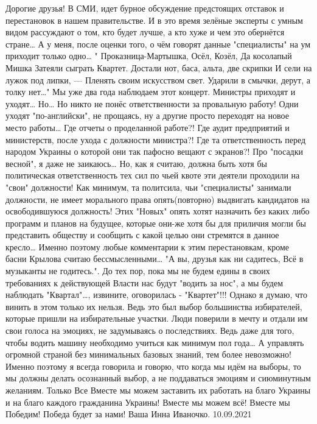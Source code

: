 \obeycr
Дорогие друзья! 
В СМИ, идет бурное обсуждение предстоящих отставок и перестановок в нашем правительстве. 
И в это время зелёные эксперты  с умным видом рассуждают о том, кто будет лучше, а кто хуже и чем это обернётся стране… 
А у меня, после оценки того, о чём говорят данные "специалисты" на ум приходит только одно… 
" Проказница-Мартышка,
Осёл,
Козёл,
Да косолапый Мишка
Затеяли сыграть Квартет.
Достали нот, баса, альта, две скрипки
И сели на лужок под липки, —
Пленять своим искусством свет.
Ударили в смычки, дерут, а толку нет…" 
Мы уже два года наблюдаем этот концерт. 
Министры приходят и уходят… 
Но… 
Но никто не понёс ответственности за провальную работу! 
Одни уходят "по-английски", не прощаясь, ну а другие просто переходят на новое место работы… 
Где отчеты о проделанной работе?!
Где аудит предприятий и министерств, после ухода с должности министра?! 
Где та ответственность  перед народом Украины  о которой они так пафосно вещают с экранов?! 
Про "посадки весной", я даже не заикаюсь… 
Но, как я считаю, должна быть  хотя бы политическая ответственность тех сил  по чьей квоте  эти деятели проходили на "свои" должности! 
Как минимум, та политсила, чьи "специалисты" занимали должности, не имеет морального права  опять(повторно)  выдвигать кандидатов на освободившуюся должность! 
Этих "Новых" опять хотят назначить без каких либо программ и планов на будущее, которые они-же  хотя бы для приличия могли бы  представить обществу и сообщить с какой целью они стремятся в данное кресло… 
Именно поэтому  любые комментарии  к этим перестановкам, кроме басни Крылова считаю бессмысленными… 
"А вы, друзья как ни садитесь, 
Всё в музыканты не годитесь.". 
До тех пор, пока мы не будем едины в своих требованиях к действующей Власти  нас будут "водить за нос", а мы будем наблюдать "Квартал"…, извините, оговорилась - "Квартет"!!! 
Однако я думаю, что винить в этом только их нельзя. 
Ведь это был выбор большинства избирателей, которые пришли на избирательные участки. 
Люди поверили в мечту и отдали им свои голоса на эмоциях, не задумываясь о последствиях. 
Ведь даже для того, чтобы водить машину  необходимо учиться как минимум пол года… 
А управлять огромной страной без минимальных базовых знаний, тем более невозможно! 
Именно поэтому  я всегда говорила и говорю, что когда мы идём на выборы, то мы должны делать осознанный выбор, а не поддаваться эмоциям и сиюминутным желаниям. 
Только Все Вместе  мы можем заставить их работать на благо Украины и на благо каждого гражданина Украины! 
Вместе мы можем всё! 
Вместе мы Победим!
Победа будет за нами! 
Ваша Инна Иваночко.
10.09.2021
\restorecr

